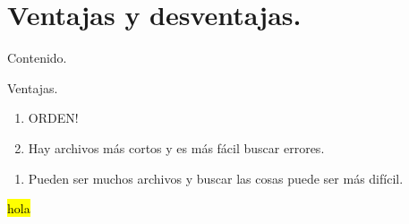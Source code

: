 \documentclass[dvipsnames,xcolor=x11names, handout]{beamer}
\newcommand{\hlc}[2][yellow]{ {\sethlcolor{#1} \hl{#2}} }
\theoremstyle{plain}
\theoremstyle{definition}
\begin{document}
\section{Ventajas y desventajas.}
\begin{frame}{Contenido.}
  \tableofcontents[currentsection]
\end{frame}
{\renewcommand{\columnseprule}{1pt}
\begin{frame}{Ventajas.}
\begin{multicols}{2}
\begin{enumerate}
\item ORDEN! 
\item Hay archivos más cortos y es más fácil buscar errores. 
\end{enumerate}
    
\columnbreak
    
\begin{enumerate}
\item Pueden ser muchos archivos y buscar las cosas puede ser más difícil. 
\end{enumerate}
\end{multicols}

{ \hl{hola}}
\end{frame}}
\end{document}
